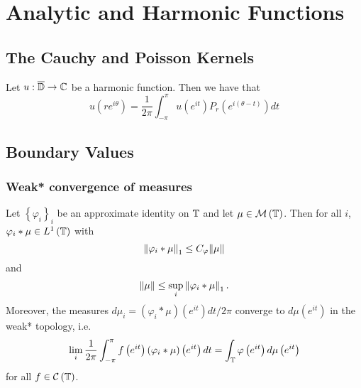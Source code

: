 \section{Analytic and Harmonic Functions}
\subsection{The Cauchy and Poisson Kernels}
\begin{proposition}
    Let $u: \overline{\mathbb D} \to \mathbb C$ be a harmonic function. Then we have that
    \begin{equation}
	u\left( re^{i\theta} \right) = \frac{1}{2\pi} \int_{-\pi}^{\pi} u\left( e^{it} \right) P_{r} \left( e^{i\left( \theta -t \right)} \right) dt
    \end{equation}
    \label{prop:poisson-integral-formula-for-harmonic-function}
\end{proposition}

\subsection{Boundary Values}
\subsubsection{Weak* convergence of measures}
\begin{theorem}
    Let $\left\{ \varphi _{i} \right\}_{i}$ be an approximate identity on $\mathbb T$ and let $\mu \in {\cal M} \left( \mathbb T \right)$. Then for all $i$, $\varphi_{i} * \mu  \in L^{1} \left( \mathbb T \right)$ with
    \begin{equation*}
	\left\lVert \varphi _{i} * \mu \right\rVert_{1} \le C_{\varphi} \lVert \mu \rVert
    \end{equation*}
    and
    \begin{equation*}
	\left\lVert \mu \right\rVert \le \sup_{i} \left\lVert \varphi_{i} * \mu \right\rVert_{1}\text{.}
    \end{equation*}
    Moreover, the measures $d\mu_{i} = \left( \varphi_{i} * \mu \right) \left( e^{it} \right) dt/2\pi$ converge to $d\mu \left( e^{it} \right)$ in the weak* topology, i.e.
    \begin{equation*}
	\lim_{i} \frac{1}{2\pi} \int_{-\pi}^{\pi} f\left( e^{it} \right) \left( \varphi_{i} * \mu \right) \left( e^{it} \right) dt = \int_{\mathbb T} \varphi\left( e^{it} \right) d\mu \left( e^{it} \right)
    \end{equation*}
    for all $f \in {\cal C} \left( \mathbb T \right)$.
    \label{thm:weak-star-measures}
\end{theorem}

